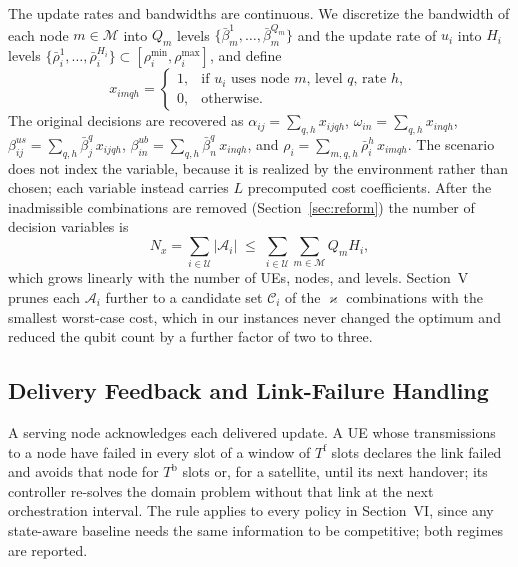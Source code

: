 The update rates and bandwidths are continuous. We discretize the bandwidth of each node $m\in\mathscr{M}$ into $Q_m$
levels $\{\bar\beta_m^1,\ldots,\bar\beta_m^{Q_m}\}$ and the update rate of $u_i$ into $H_i$ levels
$\{\bar\rho_i^1,\ldots,\bar\rho_i^{H_i}\}\subset[\rho_i^{\min},\rho_i^{\max}]$, and define
\begin{equation}
    x_{imqh}=
    \begin{cases}
        1, & \text{if } u_i \text{ uses node } m\text{, level } q\text{, rate } h, \\
        0, & \text{otherwise}.
    \end{cases}
    \label{eq:x_def}
\end{equation}
The original decisions are recovered as $\alpha_{ij}=\sum_{q,h}x_{ijqh}$, $\omega_{in}=\sum_{q,h}x_{inqh}$,
$\beta^{us}_{ij}=\sum_{q,h}\bar\beta_j^q\,x_{ijqh}$, $\beta^{ub}_{in}=\sum_{q,h}\bar\beta_n^q\,x_{inqh}$, and
$\rho_i=\sum_{m,q,h}\bar\rho_i^h\,x_{imqh}$. The scenario does not index the variable, because it is realized by the
environment rather than chosen; each variable instead carries $L$ precomputed cost coefficients. After the
inadmissible combinations are removed (Section~\ref{sec:reform}) the number of decision variables is
\begin{equation}
    N_{x}=\sum_{i\in\mathscr{U}}|\mathscr{A}_i|\;\leq\;\sum_{i\in\mathscr{U}}\sum_{m\in\mathscr{M}}Q_{m}H_{i},
    \label{eq:Nx}
\end{equation}
which grows linearly with the number of UEs, nodes, and levels. Section~V prunes each $\mathscr{A}_i$ further to a
candidate set $\mathscr{C}_i$ of the $\varkappa$ combinations with the smallest worst-case cost, which in our instances
never changed the optimum and reduced the qubit count by a further factor of two to three.

\subsection{Delivery Feedback and Link-Failure Handling}
\label{sec:feedback}

A serving node acknowledges each delivered update. A UE whose transmissions to a node have failed in every slot of a
window of $T^{\mathrm{f}}$ slots declares the link failed and avoids that node for $T^{\mathrm{b}}$ slots or, for a
satellite, until its next handover; its controller re-solves the domain problem without that link at the next
orchestration interval. The rule applies to every policy in Section~VI, since any state-aware baseline needs the same
information to be competitive; both regimes are reported.


